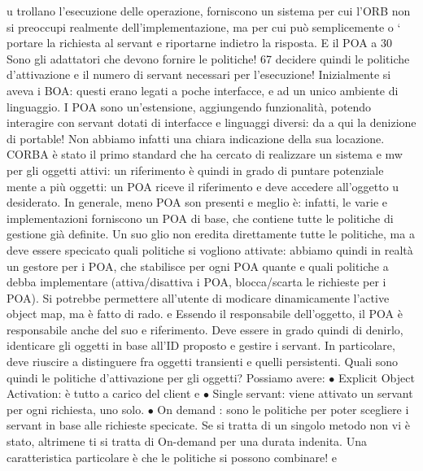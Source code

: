 \documentclass[a4paper,12pt]{article}
\begin{document}
u
trollano l'esecuzione delle operazione, forniscono un sistema per cui l'ORB non
si preoccupi realmente dell'implementazione, ma per cui può semplicemente
o
`
portare la richiesta al servant e riportarne indietro la risposta. E il POA a
30 Sono
gli adattatori che devono fornire le politiche!
67
decidere quindi le politiche d'attivazione e il numero di servant necessari per
l'esecuzione!
Inizialmente si aveva i BOA: questi erano legati a poche interfacce, e ad un
unico ambiente di linguaggio. I POA sono un'estensione, aggiungendo funzionalità, potendo interagire con servant dotati
di interfacce e linguaggi diversi: da
a
qui la denizione di portable! Non abbiamo infatti una chiara indicazione della
sua locazione.
CORBA è stato il primo standard che ha cercato di realizzare un sistema
e
mw per gli oggetti attivi: un riferimento è quindi in grado di puntare potenziale
mente a più oggetti: un POA riceve il riferimento e deve accedere all'oggetto
u
desiderato. In generale, meno POA son presenti e meglio è: infatti, le varie
e
implementazioni forniscono un POA di base, che contiene tutte le politiche di
gestione già definite. Un suo glio non eredita direttamente tutte le politiche, ma
a
deve essere specicato quali politiche si vogliono attivate: abbiamo quindi in realtà un gestore per i POA, che
stabilisce per ogni POA quante e quali politiche
a
debba implementare (attiva/disattiva i POA, blocca/scarta le richieste per i
POA). Si potrebbe permettere all'utente di modicare dinamicamente l'active
object map, ma è fatto di rado.
e
Essendo il responsabile dell'oggetto, il POA è responsabile anche del suo
e
riferimento. Deve essere in grado quindi di denirlo, identicare gli oggetti in
base all'ID proposto e gestire i servant. In particolare, deve riuscire a distinguere
fra oggetti transienti e quelli persistenti.
Quali sono quindi le politiche d'attivazione per gli oggetti? Possiamo avere:
$\bullet$ Explicit Object Activation: è tutto a carico del client
e
$\bullet$ Single servant: viene attivato un servant per ogni richiesta, uno solo.
$\bullet$ On demand : sono le politiche per poter scegliere i servant in base alle richieste specicate. Se si tratta di
un singolo metodo non vi è stato, altrimene
ti si tratta di On-demand per una durata indenita. Una caratteristica
particolare è che le politiche si possono combinare!
e
\end{document}
